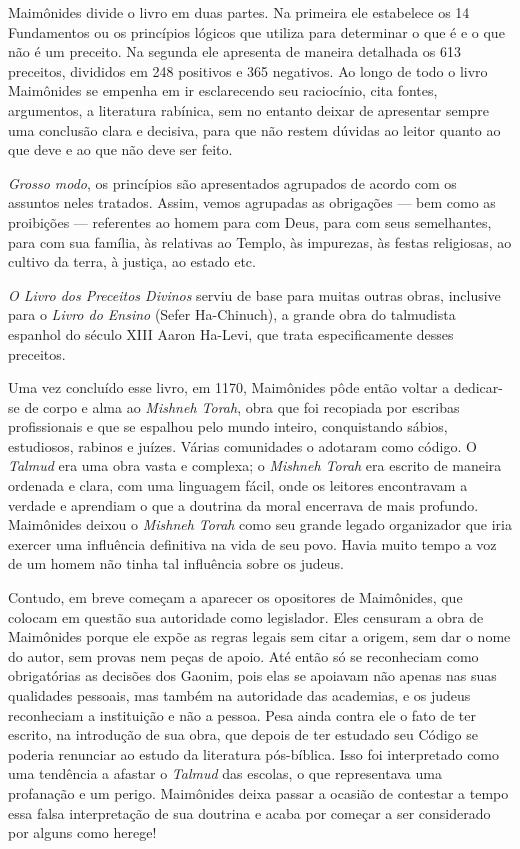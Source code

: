 Maimônides divide o livro em duas partes. Na primeira ele estabelece os
14 Fundamentos ou os princípios lógicos que utiliza para determinar o
que é e o que não é um preceito. Na segunda ele apresenta de maneira
detalhada os 613 preceitos, divididos em 248 positivos e 365 negativos.
Ao longo de todo o livro Maimônides se empenha em ir esclarecendo seu
raciocínio, cita fontes, argumentos, a literatura rabínica, sem no
entanto deixar de apresentar sempre uma conclusão clara e decisiva,
para que não restem dúvidas ao leitor quanto ao que deve e ao que não
deve ser feito.

\emph{Grosso modo}, os princípios são apresentados agrupados de acordo
com os assuntos neles tratados. Assim, vemos agrupadas as obrigações ---
bem como as proibições --- referentes ao homem para com Deus, para com
seus semelhantes, para com sua família, às relativas ao Templo, às
impurezas, às festas religiosas, ao cultivo da terra, à justiça, ao
estado etc.

\emph{O Livro dos Preceitos Divinos} serviu de base para muitas outras
obras, inclusive para o \emph{Livro do Ensino} (Sefer Ha-Chinuch), a
grande obra do talmudista espanhol do século XIII Aaron Ha-Levi, que
trata especificamente desses preceitos.


Uma vez concluído esse livro, em 1170, Maimônides pôde então voltar a
dedicar-se de corpo e alma ao \emph{Mishneh Torah}, obra que foi
recopiada por escribas profissionais e que se espalhou pelo mundo
inteiro, conquistando sábios, estudiosos, rabinos e juízes. Várias
comunidades o adotaram como código. O \emph{Talmud} era uma obra vasta
e complexa; o \emph{Mishneh Torah} era escrito de maneira ordenada e
clara, com uma linguagem fácil, onde os leitores encontravam a verdade
e aprendiam o que a doutrina da moral encerrava de mais profundo.
Maimônides deixou o \emph{Mishneh Torah} como seu grande legado
organizador que iria exercer uma influência definitiva na vida de seu
povo. Havia muito tempo a voz de um homem não tinha tal influência sobre
os judeus.

Contudo, em breve começam a aparecer os opositores de Maimônides, que
colocam em questão sua autoridade como legislador. Eles censuram a obra
de Maimônides porque ele expõe as regras legais sem citar a origem, sem
dar o nome do autor, sem provas nem peças de apoio. Até então só se
reconheciam como obrigatórias as decisões dos Gaonim, pois elas se
apoiavam não apenas nas suas qualidades pessoais, mas também na
autoridade das academias, e os judeus reconheciam a instituição e não a
pessoa. Pesa ainda contra ele o fato de ter escrito, na introdução de
sua obra, que depois de ter estudado seu Código se poderia renunciar ao
estudo da literatura pós-bíblica. Isso foi interpretado como uma
tendência a afastar o \emph{Talmud} das escolas, o que representava uma
profanação e um perigo. Maimônides deixa passar a ocasião de contestar a
tempo essa falsa interpretação de sua doutrina e acaba por começar a
ser considerado por alguns como herege!


